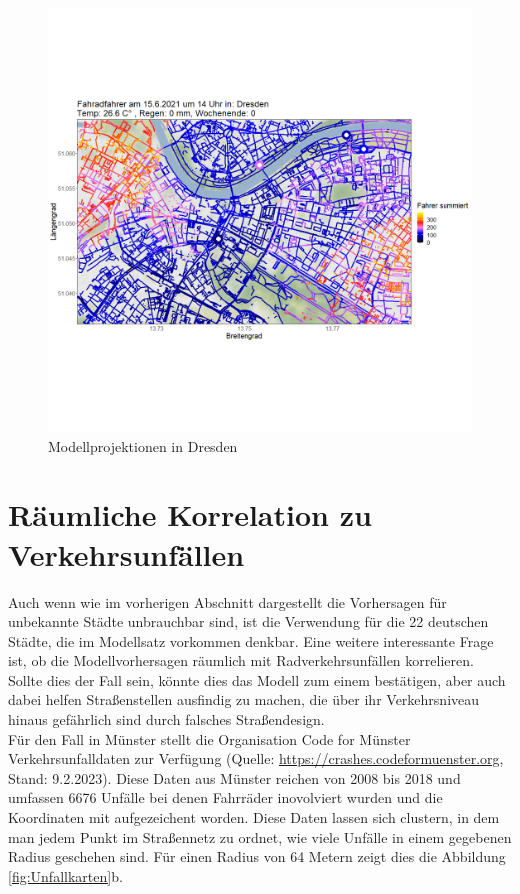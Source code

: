 \documentclass[a4paper,12pt]{thesis}
\begin{document}
\begin{figure}[!ht]
	\centering
	\includegraphics[width=\textwidth]{Plots/Dresden.png}
	\caption{Modellprojektionen in Dresden}
	\label{Dresden}
\end{figure}

\section{Räumliche Korrelation zu Verkehrsunfällen}

Auch wenn wie im vorherigen Abschnitt dargestellt die Vorhersagen für unbekannte Städte unbrauchbar sind, ist die Verwendung für die 22 deutschen Städte, die im Modellsatz vorkommen denkbar. Eine weitere interessante Frage ist, ob die Modellvorhersagen räumlich mit Radverkehrsunfällen korrelieren. Sollte dies der Fall sein, könnte dies das Modell zum einem bestätigen, aber auch dabei helfen Straßenstellen ausfindig zu machen, die über ihr Verkehrsniveau hinaus gefährlich sind durch falsches Straßendesign.\\
Für den Fall in Münster stellt die Organisation Code for Münster Verkehrsunfalldaten zur Verfügung (Quelle: \url{https://crashes.codeformuenster.org}, Stand: 9.2.2023). Diese Daten aus Münster reichen von 2008 bis 2018 und umfassen 6676 Unfälle bei denen Fahrräder inovolviert wurden und die Koordinaten mit aufgezeichent worden. Diese Daten lassen sich clustern, in dem man jedem Punkt im Straßennetz zu ordnet, wie viele Unfälle in einem gegebenen Radius geschehen sind. Für einen Radius von 64 Metern zeigt dies die Abbildung \ref{fig:Unfallkarten}b.
\end{document}
